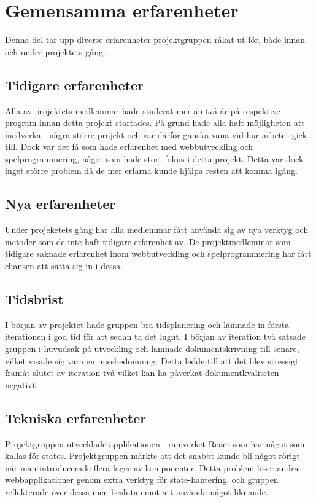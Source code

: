 \section{Gemensamma erfarenheter}
Denna del tar upp diverse erfarenheter projektgruppen råkat ut för, både innan och under projektets gång.


\subsection{Tidigare erfarenheter}
Alla av projektets medlemmar hade studerat mer än två år på respektive program innan detta projekt startades. På grund hade alla haft möjligheten att medverka i några större projekt och var därför ganska vana vid hur arbetet gick till. Dock var det få som hade erfarenhet med webbutveckling och spelprogrammering, något som hade stort fokus i detta projekt. Detta var dock inget större problem då de mer erfarna kunde hjälpa resten att komma igång.

\subsection{Nya erfarenheter}
Under projeketets gång har alla medlemmar fått använda sig av nya verktyg och metoder som de inte haft tidigare erfarenhet av. De projektmedlemmar som tidigare saknade erfarenhet inom webbutveckling och spelprogrammering har fått chansen att sätta sig in i dessa.


\subsection{Tidsbrist}
I början av projektet hade gruppen bra tidsplanering och lämnade in första iterationen i god tid för att sedan ta det lugnt. I början av iteration två satsade gruppen i huvudsak på utveckling och lämnade dokumentskrivning till senare, vilket visade sig vara en missbedömning. Detta ledde till att det blev stressigt framåt slutet av iteration två vilket kan ha påverkat dokumentkvaliteten negativt.

\subsection{Tekniska erfarenheter}
Projektgruppen utvecklade applikationen i ramverket React som har något som kallas för states. Projektgruppen märkte att det snabbt kunde bli något rörigt när man introducerade flera lager av komponenter. Detta problem löser andra webbapplikationer genom extra verktyg för state-hantering, och gruppen reflekterade över dessa men besluta emot att använda något liknande.




